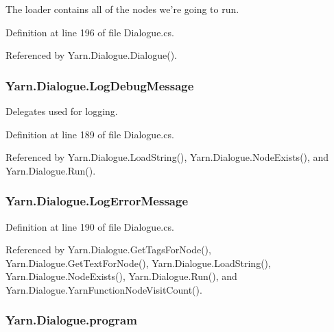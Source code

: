 The loader contains all of the nodes we're going to run. 



Definition at line 196 of file Dialogue.\-cs.



Referenced by Yarn.\-Dialogue.\-Dialogue().

\hypertarget{a00088_a381f48bb0fbb294f8cf44ca57f11be31}{
\subsubsection[{Log\-Debug\-Message}]{ Yarn.\-Dialogue.\-Log\-Debug\-Message}}\label{a00088_a381f48bb0fbb294f8cf44ca57f11be31}


Delegates used for logging. 



Definition at line 189 of file Dialogue.\-cs.



Referenced by Yarn.\-Dialogue.\-Load\-String(), Yarn.\-Dialogue.\-Node\-Exists(), and Yarn.\-Dialogue.\-Run().

\hypertarget{a00088_a9801e83dd044d6498fdf6ebcc6bec5ac}{
\subsubsection[{Log\-Error\-Message}]{ Yarn.\-Dialogue.\-Log\-Error\-Message}}\label{a00088_a9801e83dd044d6498fdf6ebcc6bec5ac}


Definition at line 190 of file Dialogue.\-cs.



Referenced by Yarn.\-Dialogue.\-Get\-Tags\-For\-Node(), Yarn.\-Dialogue.\-Get\-Text\-For\-Node(), Yarn.\-Dialogue.\-Load\-String(), Yarn.\-Dialogue.\-Node\-Exists(), Yarn.\-Dialogue.\-Run(), and Yarn.\-Dialogue.\-Yarn\-Function\-Node\-Visit\-Count().

\hypertarget{a00088_a0a1cca92325f430425d784d416cb5c2b}{
\subsubsection[{program}]{ Yarn.\-Dialogue.\-program\hspace{0.3cm}{\ttfamily [package]}}}\label{a00088_a0a1cca92325f430425d784d416cb5c2b}


